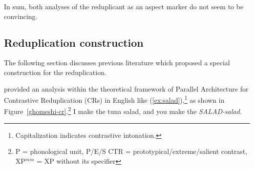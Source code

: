 In sum, both analyses of the reduplicant as an aspect marker do not seem to be convincing.




 
 
\subsection{Reduplication construction}\label{sec:construc}
 
The following section discusses previous literature which proposed a special construction for the reduplication.
 


\citet{Ghomeshietal2004} provided an analysis within the theoretical framework of Parallel Architecture \citep{Jackendoff1997, Jackendoff2002} for Contrastive Reduplication (CRs) in English like (\ref{ex:salad}),\footnote{Capitalization indicates contrastive intonation.} 
as shown in Figure~\ref{ghomeshi-cr}.\footnote{{P} = phonological unit, {P/E/S CTR} = prototypical/extreme/salient contrast, XP$^{min}$ = XP without its specifier} 
\ea\label{ex:salad}
I make the tuna salad, and you make the \textit{SALAD-salad}.
\z
